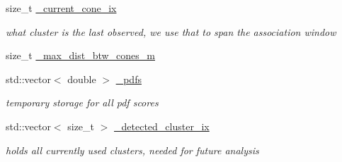 \begin{DoxyCompactItemize}
\mbox{\label{classclara_1_1data__association_a1b00208be9b91fa243cad3bec7ec3982}} 
size\+\_\+t \hyperlink{classclara_1_1data__association_a1b00208be9b91fa243cad3bec7ec3982}{\+\_\+current\+\_\+cone\+\_\+ix}
\begin{DoxyCompactList}\small\item\em what cluster is the last observed, we use that to span the association window \end{DoxyCompactList}\item 
size\+\_\+t \hyperlink{classclara_1_1data__association_aa6fa8a0a838466029189534c94ce1443}{\+\_\+max\+\_\+dist\+\_\+btw\+\_\+cones\+\_\+m}
\item 
\mbox{\label{classclara_1_1data__association_aaa83713106643b0191b770b072f2ee16}} 
std\+::vector$<$ double $>$ \hyperlink{classclara_1_1data__association_aaa83713106643b0191b770b072f2ee16}{\+\_\+pdfs}
\begin{DoxyCompactList}\small\item\em temporary storage for all pdf scores \end{DoxyCompactList}\item 
\mbox{\label{classclara_1_1data__association_a9b4443f07de5a2b4747c869855f09d61}} 
std\+::vector$<$ size\+\_\+t $>$ \hyperlink{classclara_1_1data__association_a9b4443f07de5a2b4747c869855f09d61}{\+\_\+detected\+\_\+cluster\+\_\+ix}
\begin{DoxyCompactList}\small\item\em holds all currently used clusters, needed for future analysis \end{DoxyCompactList}\end{DoxyCompactItemize}
